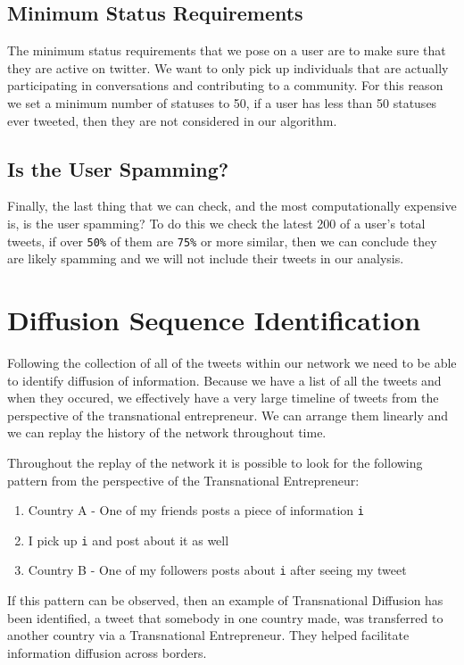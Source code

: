 \subsection{Minimum Status Requirements}
The minimum status requirements that we pose on a user are to make
sure that they are active on twitter. We want to only pick up
individuals that are actually participating in conversations and
contributing to a community. For this reason we set a minimum number
of statuses to 50, if a user has less than 50 statuses ever tweeted,
then they are not considered in our algorithm.

\subsection{Is the User Spamming?}
Finally, the last thing that we can check, and the most
computationally expensive is, is the user spamming? To do this we
check the latest 200 of a user's total tweets, if over \verb|50%| of
them are \verb|75%| or more similar, then we can conclude they are
likely spamming and we will not include their tweets in our analysis.

\section{Diffusion Sequence Identification}
Following the collection of all of the tweets within our network we
need to be able to identify diffusion of information. Because we have
a list of all the tweets and when they occured, we effectively have a
very large timeline of tweets from the perspective of the
transnational entrepreneur. We can arrange them linearly and we can
replay the history of the network throughout time.

Throughout the replay of the network it is possible to look for the
following pattern from the perspective of the Transnational
Entrepreneur:

\begin{enumerate}
\item Country A - One of my friends posts a piece of information \verb|i| 
\item I pick up \verb|i| and post about it as well
\item Country B - One of my followers posts about \verb|i| after seeing my tweet
\end{enumerate}

If this pattern can be observed, then an example of Transnational
Diffusion has been identified, a tweet that somebody in one country
made, was transferred to another country via a Transnational
Entrepreneur. They helped facilitate information diffusion across
borders.

